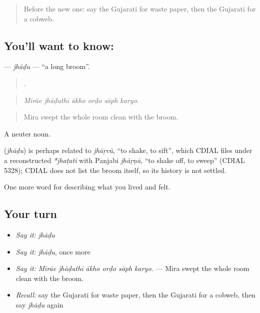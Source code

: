 \label{lesson:GU-C518-jhadu}



\begin{quote}
Before the new one: say the Gujarati for waste paper, then the Gujarati for a cobweb.
\end{quote}

\subsection*{You'll want to know: }
\textbf{} — \emph{jhāḍu} — \textquotedblleft{}a long broom\textquotedblright{}.

\begin{quote}
     .
\end{quote}

\begin{quote}
\emph{Mīrāe jhāḍuthī ākho orḍo sāph karyo.}
\end{quote}

\begin{quote}
Mira swept the whole room clean with the broom.
\end{quote}

A neuter noun.

\begin{cousinweb}
\textbf{} (\emph{jhāḍu}) is perhaps related to \emph{jhāṛvũ}, \textquotedblleft{}to shake, to sift\textquotedblright{}, which CDIAL files under a reconstructed \emph{*jhaṭati} with Panjabi \emph{jhāṛṇā}, \textquotedblleft{}to shake off, to sweep\textquotedblright{} (CDIAL 5328); CDIAL does not list the broom itself, so its history is not settled.
\end{cousinweb}

\begin{grammarlens}[title={What you've built}]
One more word for describing what you lived and felt.
\end{grammarlens}

\subsection*{Your turn}
\begin{itemize}
\raggedright
  \item \emph{Say it:} \emph{jhāḍu}
  \item \emph{Say it:} \emph{jhāḍu}, once more
  \item \emph{Say it:} \emph{Mīrāe jhāḍuthī ākho orḍo sāph karyo.} — Mira swept the whole room clean with the broom.
  \item \emph{Recall:} say the Gujarati for waste paper, then the Gujarati for a cobweb, then say \emph{jhāḍu} again
\end{itemize}

